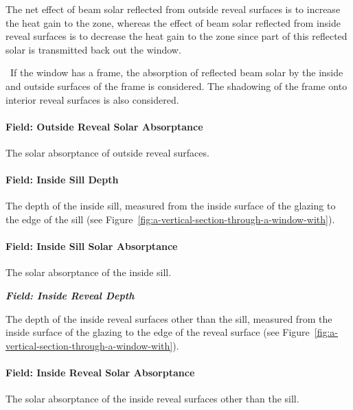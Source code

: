 The net effect of beam solar reflected from outside reveal surfaces is to increase the heat gain to the zone, whereas the effect of beam solar reflected from inside reveal surfaces is to decrease the heat gain to the zone since part of this reflected solar is transmitted back out the window.

~If the window has a frame, the absorption of reflected beam solar by the inside and outside surfaces of the frame is considered. The shadowing of the frame onto interior reveal surfaces is also considered.

\paragraph{Field: Outside Reveal Solar Absorptance}\label{field-outside-reveal-solar-absorptance}

The solar absorptance of outside reveal surfaces.

\paragraph{Field: Inside Sill Depth}\label{field-inside-sill-depth}

The depth of the inside sill, measured from the inside surface of the glazing to the edge of the sill (see Figure~\ref{fig:a-vertical-section-through-a-window-with}).

\paragraph{Field: Inside Sill Solar Absorptance}\label{field-inside-sill-solar-absorptance}

The solar absorptance of the inside sill.

\textbf{\emph{Field: Inside Reveal Depth}}

The depth of the inside reveal surfaces other than the sill, measured from the inside surface of the glazing to the edge of the reveal surface (see Figure~\ref{fig:a-vertical-section-through-a-window-with}).

\paragraph{Field: Inside Reveal Solar Absorptance}\label{field-inside-reveal-solar-absorptance}

The solar absorptance of the inside reveal surfaces other than the sill.

